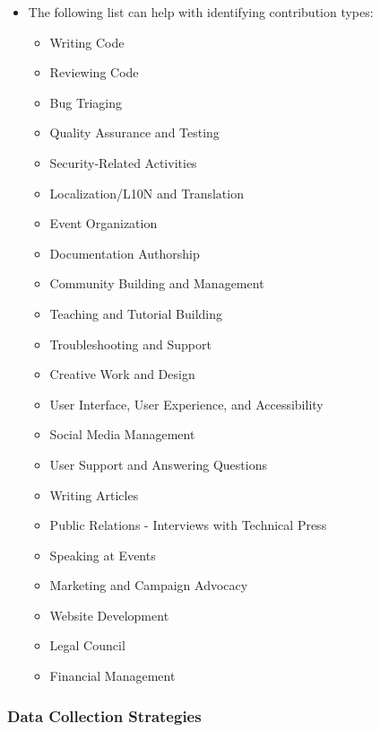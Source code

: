 \begin{itemize}
\tightlist
\item
  The following list can help with identifying contribution types:

  \begin{itemize}
  \tightlist
  \item
    Writing Code
  \item
    Reviewing Code
  \item
    Bug Triaging
  \item
    Quality Assurance and Testing
  \item
    Security-Related Activities
  \item
    Localization/L10N and Translation
  \item
    Event Organization
  \item
    Documentation Authorship
  \item
    Community Building and Management
  \item
    Teaching and Tutorial Building
  \item
    Troubleshooting and Support
  \item
    Creative Work and Design
  \item
    User Interface, User Experience, and Accessibility
  \item
    Social Media Management
  \item
    User Support and Answering Questions
  \item
    Writing Articles
  \item
    Public Relations - Interviews with Technical Press
  \item
    Speaking at Events
  \item
    Marketing and Campaign Advocacy
  \item
    Website Development
  \item
    Legal Council
  \item
    Financial Management
  \end{itemize}
\end{itemize}

\hypertarget{data-collection-strategies}{%
\subsubsection{Data Collection
Strategies}\label{data-collection-strategies}}

